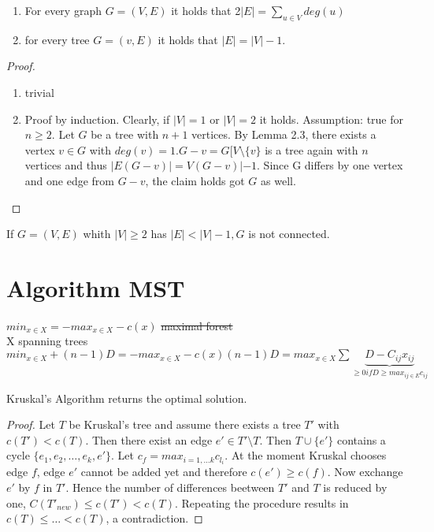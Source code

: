 \begin{lem}
	\begin{enumerate}
	\item For every graph $G=(V,E)$ it holds that 2$|E|=\sum\limits_{u \in V} deg(u)$
	\item for every tree $G=(v,E)$ it holds that $|E|=|V|-1$.
	\end{enumerate}
	\end{lem}

\begin{proof}



	\begin{enumerate}
		\item trivial
		\item Proof by induction. Clearly, if $|V|=1$ or $|V|=2$ it holds. Assumption: true for $n \geq 2.$
		Let $G$ be a tree with $n+1$ vertices. By Lemma 2.3, there exists a vertex $v \in G$ with $deg(v)=1. G-v=G[V\setminus \{v\}$ is a tree again with $n$ vertices and thus $|E(G-v)|=V(G-v)|-1$. Since G differs by one vertex and one edge from $G-v$, the claim holds got $G$ as well.
	\end{enumerate}
\end{proof}


\begin{lem}
If $G=(V,E)$ whith $|V| \geq 2$ has $|E|< |V|-1, G$ is not connected.
\end{lem}

\section*{Algorithm MST}
$min_{x \in X} = -max_{x \in X} -c(x)$ \sout{maximal forest}\\
X spanning trees\\
$min_{x \in X} + (n-1)D= -max_{x \in X} -c(x) (n-1)D =max_{x\in X} \sum \underbrace{D-C_{ij}x_{ij}}_{\geq 0 if D \geq max_{ij \in E} c_{ij}}$

\begin{thm}
Kruskal's Algorithm returns the optimal solution.
\end{thm}
\begin{proof}
Let $T$ be Kruskal's tree and assume there exists a tree $T'$ with $c(T') < c(T)$. Then there exist an edge $e' \in T'\setminus T$. Then $T \cup \{e'\} $ contains a cycle $\{e_1, e_2, \hdots, e_k, e'\}$. Let $ c_f=max_{i=1, \hdots k}c_{l_i} $. 
At the moment Kruskal chooses edge $f$, edge $e'$ cannot be added yet and therefore $c(e')\geq c(f)$. Now exchange $e'$ by $f$ in $T'$. Hence the number of differences beetween $T'$ and $T$ is reduced by one, $C(T'_{new})\leq c(T') < c(T)$. Repeating the procedure results in $c(T) \leq \hdots < c(T)$, a contradiction.
\end{proof}
